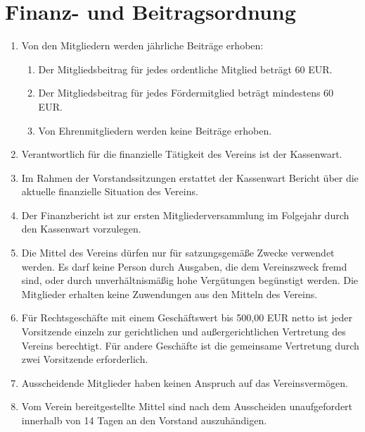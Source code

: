 \documentclass[12pt,a4paper,draft]{article}
\begin{document}
\section{Finanz- und Beitragsordnung} %
\begin{enumerate}
\item Von den Mitgliedern werden jährliche Beiträge erhoben:
\begin{enumerate}
\item Der Mitgliedsbeitrag für jedes ordentliche Mitglied beträgt 60 EUR. 

\item Der Mitgliedsbeitrag für jedes Fördermitglied beträgt mindestens 60 EUR. 

\item Von Ehrenmitgliedern werden keine Beiträge erhoben.
\end{enumerate}

\item Verantwortlich für die finanzielle Tätigkeit des Vereins ist der 
Kassenwart.

\item Im Rahmen der Vorstandssitzungen erstattet der Kassenwart Bericht über 
die aktuelle finanzielle Situation des Vereins.

\item Der Finanzbericht ist zur ersten Mitgliederversammlung im Folgejahr durch 
den Kassenwart vorzulegen.

\item Die Mittel des Vereins dürfen nur für satzungsgemäße Zwecke verwendet 
werden. Es darf keine Person durch Ausgaben, die dem Vereinszweck fremd sind, 
oder durch unverhältnismäßig hohe Vergütungen begünstigt werden. Die Mitglieder 
erhalten keine Zuwendungen aus den Mitteln des Vereins.

\item Für Rechtsgeschäfte mit einem Geschäftswert bis 500,00 EUR netto ist 
jeder Vorsitzende einzeln zur gerichtlichen und außergerichtlichen Vertretung 
des Vereins berechtigt. Für andere Geschäfte ist die gemeinsame Vertretung 
durch zwei Vorsitzende erforderlich.

\item Ausscheidende Mitglieder haben keinen Anspruch auf das Vereinsvermögen.

\item Vom Verein bereitgestellte Mittel sind nach dem Ausscheiden 
unaufgefordert innerhalb von 14 Tagen an den Vorstand auszuhändigen.


\end{enumerate}
\end{document}
